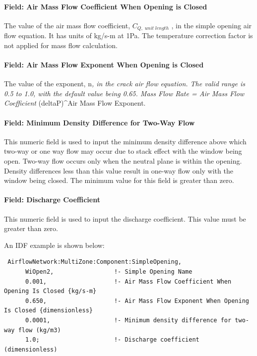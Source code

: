 \paragraph{Field: Air Mass Flow Coefficient When Opening is Closed}\label{field-air-mass-flow-coefficient-when-opening-is-closed-2}

The value of the air mass flow coefficient, \({C_{Q,\;unit\;length}}\) , in the simple opening air flow equation. It has units of kg/s-m at 1Pa. The temperature correction factor is not applied for mass flow calculation.

\paragraph{Field: Air Mass Flow Exponent When Opening is Closed}\label{field-air-mass-flow-exponent-when-opening-is-closed-2}

The value of the exponent, n\emph{, in the crack air flow equation. The valid range is 0.5 to 1.0, with the default value being 0.65. Mass Flow Rate = Air Mass Flow Coefficient} (deltaP)\^{}Air Mass Flow Exponent.

\paragraph{Field: Minimum Density Difference for Two-Way Flow}\label{field-minimum-density-difference-for-two-way-flow}

This numeric field is used to input the minimum density difference above which two-way or one way flow may occur due to stack effect with the window being open. Two-way flow occurs only when the neutral plane is within the opening. Density differences less than this value result in one-way flow only with the window being closed. The minimum value for this field is greater than zero.

\paragraph{Field: Discharge Coefficient}\label{field-discharge-coefficient-2}

This numeric field is used to input the discharge coefficient. This value must be greater than zero.

An IDF example is shown below:

\begin{lstlisting}
 AirflowNetwork:MultiZone:Component:SimpleOpening,
      WiOpen2,                 !- Simple Opening Name
      0.001,                   !- Air Mass Flow Coefficient When Opening Is Closed {kg/s-m}
      0.650,                   !- Air Mass Flow Exponent When Opening Is Closed {dimensionless}
      0.0001,                  !- Minimum density difference for two-way flow (kg/m3)
      1.0;                     !- Discharge coefficient (dimensionless)
\end{lstlisting}

